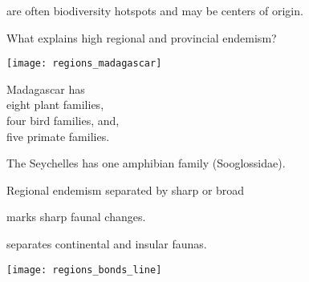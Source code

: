 \documentclass[t]{beamer}
\begin{document}
%
{
\begin{frame}[b]{ are often biodiversity hotspots and may be centers of origin.}

\end{frame}
}
%
{
\begin{frame}[b]

\end{frame}
}
%
{
\begin{frame}[b]

\end{frame}
}
%
\begin{frame}[t]{What explains high regional and provincial endemism?}
	\begin{multicols}{2}
	
		\texttt{[image: regions\_madagascar]}
	
		\columnbreak
	
		\noindent Madagascar has\\ \quad eight plant families, \\ \quad four bird families, and,\\ \quad five primate families.
		
		\vspace{\baselineskip}
		
		\noindent The Seychelles has one amphibian family (Sooglossidae).
		
		\vspace{\baselineskip}
		
	\end{multicols}

\end{frame}
%
{
\begin{frame}[b]{Regional endemism separated by sharp or broad }

\end{frame}
}
%
{
\begin{frame}[b]{ marks sharp faunal changes.}

\end{frame}
}
%
\begin{frame}[b]{ separates continental and insular faunas.}
	\begin{center}
		\texttt{[image: regions\_bonds\_line]}
	\end{center}
\end{frame}
\end{document}
